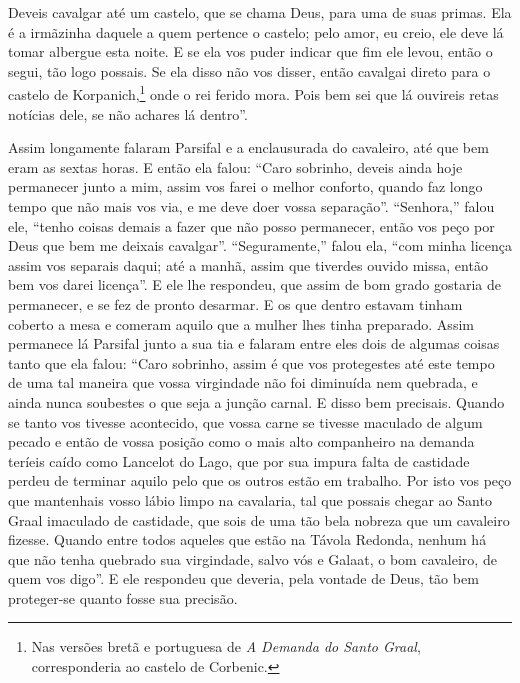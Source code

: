 Deveis cavalgar até um castelo, que se chama Deus, para uma de suas primas.
Ela é a irmãzinha daquele a quem pertence o castelo; pelo amor, eu creio, ele
deve lá tomar albergue esta noite. E se ela vos puder indicar que fim ele
levou, então o segui, tão logo possais. Se ela disso não vos disser, então
cavalgai direto para o castelo de Korpanich,\footnote{ Nas versões bretã e
portuguesa de \textit{A Demanda do Santo Graal}, corresponderia ao castelo de
Corbenic.}  onde o rei ferido mora. Pois bem sei que lá ouvireis
retas notícias dele, se não achares lá dentro”. 

 Assim longamente falaram Parsifal e a enclausurada do cavaleiro, até que
bem eram as sextas horas. E então ela falou: “Caro sobrinho, deveis ainda hoje
permanecer junto a mim, assim vos farei o melhor conforto, quando faz longo
tempo que não mais vos via, e me deve doer vossa separação”. “Senhora,'' falou
ele, “tenho coisas demais a fazer que não posso permanecer, então vos peço por
Deus que bem me deixais cavalgar”. “Seguramente,” falou ela, “com minha licença
assim vos separais daqui; até a manhã, assim que tiverdes ouvido missa, então
bem vos darei licença”. E ele lhe respondeu, que assim de bom grado gostaria de
permanecer, e se fez de pronto desarmar. E os que dentro estavam tinham coberto
a mesa e comeram aquilo que a mulher lhes tinha preparado. Assim permanece lá
Parsifal junto a sua tia e falaram entre eles dois de algumas coisas tanto que
ela falou: “Caro sobrinho, assim é que  vos protegestes até este tempo de uma
tal maneira que vossa virgindade não foi diminuída nem quebrada, e ainda nunca
soubestes o que seja a junção carnal. E disso bem precisais. Quando se tanto
vos tivesse acontecido, que vossa carne se tivesse maculado de algum pecado e
então de vossa posição como o mais alto companheiro na demanda teríeis caído
como Lancelot do Lago, que por sua impura falta de castidade perdeu de
terminar aquilo pelo que os outros estão em trabalho. Por isto vos peço que
mantenhais vosso lábio limpo  na cavalaria, tal que
possais chegar ao Santo Graal imaculado de castidade, que sois de uma tão bela
nobreza que um cavaleiro fizesse. Quando entre todos aqueles que estão na
Távola Redonda, nenhum há que não tenha quebrado sua virgindade, salvo vós e
Galaat, o bom cavaleiro, de quem vos digo”. E ele respondeu
que deveria, pela vontade de Deus, tão bem proteger-se quanto fosse sua
precisão.  

